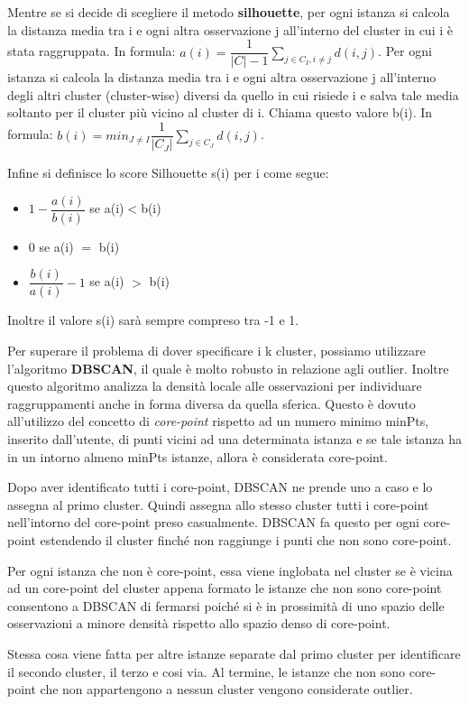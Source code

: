 \documentclass[a4paper]{extarticle}
\begin{document}
Mentre se si decide di scegliere il metodo \textbf{silhouette}, per ogni istanza si calcola la distanza media tra i e ogni altra osservazione j all'interno del cluster in cui i è stata raggruppata. In formula: $a(i) = \dfrac{1}{|C|-1} \sum_{j \in C_I, i \not = j} d(i,j)$. Per ogni istanza si calcola la distanza media tra i e ogni altra osservazione j all’interno degli altri cluster (cluster-wise) diversi da quello in cui risiede i e salva tale media soltanto per il cluster più vicino al cluster di i. Chiama questo valore b(i). In formula: $b(i) = min_{J \not = I} \dfrac{1}{|C_J|} \sum_{j\in C_J} d(i,j)$.

Infine si definisce lo score Silhouette s(i) per i come segue:
\begin{itemize}
\item $1 - \dfrac{a(i)}{b(i)}$ se a(i)$<$b(i)
\item 0 se a(i) $=$ b(i)
\item $\dfrac{b(i)}{a(i)} - 1$ se a(i) $>$ b(i)
\end{itemize}

Inoltre il valore s(i) sarà sempre compreso tra -1 e 1.

Per superare il problema di dover specificare i k cluster, possiamo utilizzare l'algoritmo \textbf{DBSCAN}, il quale è molto robusto in relazione agli outlier. Inoltre questo algoritmo analizza la densità locale alle osservazioni per individuare raggruppamenti anche in forma diversa da quella sferica. Questo è dovuto all'utilizzo del concetto di \textit{core-point} rispetto ad un numero minimo minPts, inserito dall'utente, di punti vicini ad una determinata istanza e se tale istanza ha in un intorno almeno minPts istanze, allora è considerata core-point.

Dopo aver identificato tutti i core-point, DBSCAN ne prende uno a caso e lo assegna al primo cluster. Quindi assegna allo stesso cluster tutti i core-point nell'intorno del core-point preso casualmente. DBSCAN fa questo per ogni core-point estendendo il cluster finché non raggiunge i punti che non sono core-point.

Per ogni istanza che non è core-point, essa viene inglobata nel cluster se è vicina ad un core-point del cluster appena formato
le istanze che non sono core-point consentono a DBSCAN di fermarsi poiché si è in prossimità di uno spazio delle osservazioni a minore densità rispetto allo spazio denso di core-point.

Stessa cosa viene fatta per altre istanze separate dal primo cluster per identificare il secondo cluster, il terzo e cosi via. Al termine, le istanze che non sono core-point che non appartengono a nessun cluster vengono considerate outlier.
\end{document}
